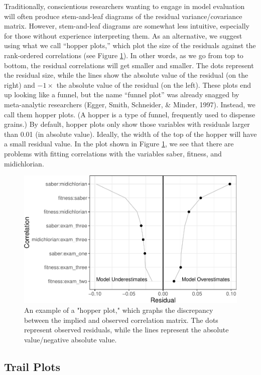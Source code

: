 \documentclass[
  english,
  man]{apa6}
\begin{document}
Traditionally, conscientious researchers wanting to engage in model evaluation will often produce stem-and-leaf diagrams of the residual variance/covariance matrix. However, stem-and-leaf diagrams are somewhat less intuitive, especially for those without experience interpreting them. As an alternative, we suggest using what we call ``hopper plots,'' which plot the size of the residuals against the rank-ordered correlations (see Figure \ref{fig:hopper}). In other words, as we go from top to bottom, the residual correlations will get smaller and smaller. The dots represent the residual size, while the lines show the absolute value of the residual (on the right) and \(-1\times\) the absolute value of the residual (on the left). These plots end up looking like a funnel, but the name ``funnel plot'' was already snagged by meta-analytic researchers (Egger, Smith, Schneider, \& Minder, 1997). Instead, we call them hopper plots. (A hopper is a type of funnel, frequently used to dispense grains.) By default, hopper plots only show those variables with residuals larger than 0.01 (in absolute value). Ideally, the width of the top of the hopper will have a small residual value. In the plot shown in Figure \ref{fig:hopper}, we see that there are problems with fitting correlations with the variables saber, fitness, and midichlorian.

\begin{figure}

{\centering \includegraphics[width=0.7\linewidth]{flexplavaan_draft_files/figure-latex/hopper-1} 

}

\caption{An example of a "hopper plot," which graphs the discrepancy between the implied and observed correlation matrix. The dots represent observed residuals, while the lines represent the absolute value/negative absolute value.}\label{fig:hopper}
\end{figure}

\hypertarget{trail-plots}{%
\subsection{Trail Plots}\label{trail-plots}}
\end{document}
